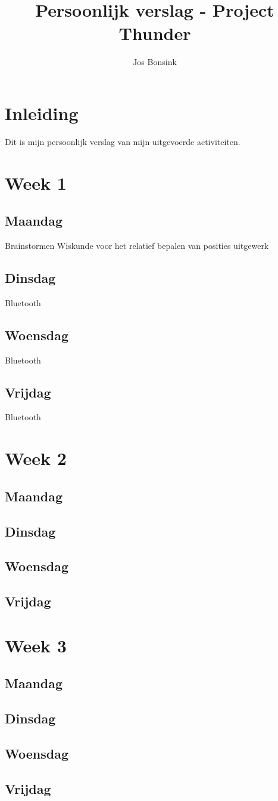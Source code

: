 \documentclass[12pt]{article}
\author{Jos Bonsink}
\begin{document}
\title{Persoonlijk verslag - Project Thunder}
\maketitle

\section*{Inleiding}
Dit is mijn persoonlijk verslag van mijn uitgevoerde activiteiten.

\section*{Week 1}
\subsection*{Maandag}
Brainstormen
Wiskunde voor het relatief bepalen van posities uitgewerk

\subsection*{Dinsdag}
Bluetooth

\subsection*{Woensdag}
Bluetooth

\subsection*{Vrijdag}
Bluetooth

\section*{Week 2}
\subsection*{Maandag}
\subsection*{Dinsdag}
\subsection*{Woensdag}
\subsection*{Vrijdag}

\section*{Week 3}
\subsection*{Maandag}
\subsection*{Dinsdag}
\subsection*{Woensdag}
\subsection*{Vrijdag}
\end{document}
